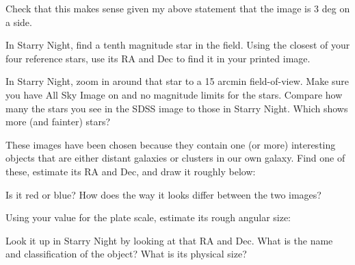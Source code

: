 \vspace{100pt}

\noindent Check that this makes sense given my above statement that
the image is 3 deg on a side.

\vspace{100pt}

\noindent In Starry Night, find a tenth magnitude star in the
field. Using the closest of your four reference stars, use its RA and
Dec to find it in your printed image. 

\noindent In Starry Night, zoom in around that star to a 15 arcmin
field-of-view.  Make sure you have All Sky Image on and no magnitude
limits for the stars. Compare how many the stars you see in the SDSS
image to those in Starry Night. Which shows more (and fainter) stars?

\clearpage


\noindent These images have been chosen because they contain one (or
more) interesting objects that are either distant galaxies or clusters
in our own galaxy. Find one of these, estimate its RA and Dec, and
draw it roughly below:

\vspace{100pt}

\noindent Is it red or blue? How does the way it looks differ between the two
images?

\vspace{80pt}

\noindent Using your value for the plate scale, estimate its rough angular size:

\vspace{40pt}

\noindent Look it up in Starry Night by looking at that RA and
Dec. What is the name and classification of the object? What is its
physical size?

